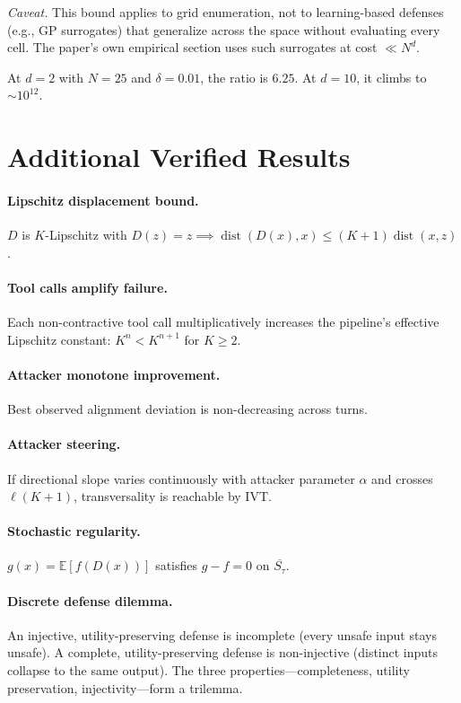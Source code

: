 \documentclass[11pt]{article}
\newcommand{\cl}[1]{\overline{#1}}
\newcommand{\dist}{\operatorname{dist}}
\begin{document}
\noindent\textit{Caveat.} This bound applies to grid enumeration, not
to learning-based defenses (e.g., GP surrogates) that generalize across
the space without evaluating every cell. The paper's own empirical
section uses such surrogates at cost $\ll N^d$.

At $d=2$ with $N=25$ and $\delta=0.01$, the ratio is $6.25$.
At $d=10$, it climbs to $\sim 10^{12}$.


\section{Additional Verified Results}
\label{app:additional}

\paragraph{Lipschitz displacement bound.}
$D$ is $K$-Lipschitz with $D(z) = z \implies
\dist(D(x), x) \leq (K+1)\dist(x,z)$.

\paragraph{Tool calls amplify failure.}
Each non-contractive tool call multiplicatively increases the pipeline's
effective Lipschitz constant: $K^n < K^{n+1}$ for $K \geq 2$.

\paragraph{Attacker monotone improvement.}
Best observed alignment deviation is non-decreasing across turns.

\paragraph{Attacker steering.}
If directional slope varies continuously with attacker parameter $\alpha$
and crosses $\ell(K+1)$, transversality is reachable by IVT.

\paragraph{Stochastic regularity.}
$g(x) = \mathbb{E}[f(D(x))]$ satisfies $g - f = 0$ on $\cl{S_\tau}$.

\paragraph{Discrete defense dilemma.}
An injective, utility-preserving defense is incomplete (every unsafe
input stays unsafe). A complete, utility-preserving defense is
non-injective (distinct inputs collapse to the same output).
The three properties---completeness, utility preservation,
injectivity---form a trilemma.
\end{document}
